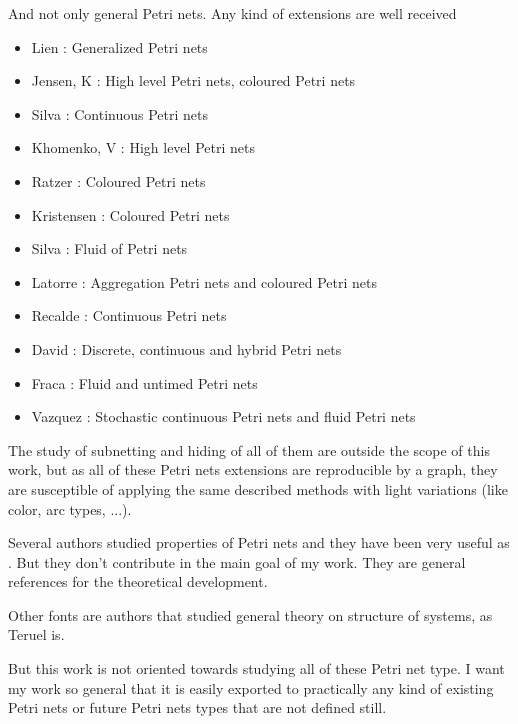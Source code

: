 And not only general Petri nets. Any kind of extensions are well received
\begin{itemize}
\item Lien \cite{EPN-Lien1976251}: Generalized Petri nets
\item Jensen, K \cite{G-EPN-Jensen1985723,EPN-SM-Jensen2007213,EPN-Jensen20091}: High level
Petri nets, coloured Petri nets
\item Silva \cite{EPN-PROP-Silva2002314,EPN-SM-Silva2011427}: Continuous Petri nets 
\item Khomenko, V \cite{G-SM-Khomenko2003458}: High level Petri nets
\item Ratzer \cite{EPN-PROP-Ratzer2003450}: Coloured Petri nets
\item Kristensen \cite{EPN-Kristensen2004626,EPN-SM-Kristensen200819}: Coloured Petri nets
\item Silva \cite{EPN-Silva2004253}: Fluid of Petri nets
\item Latorre \cite{EPN-SM-Latorre2010152,EPN-SM-Latorre2010247}: Aggregation Petri nets and coloured Petri nets
\item Recalde \cite{EPN-Recalde2010235}: Continuous Petri nets
\item David \cite{EPN-David2010}: Discrete, continuous and hybrid Petri nets
\item Fraca \cite{EPN-Fraca201221}: Fluid and untimed Petri nets
\item Vazquez \cite{EPN-Vazquez2012641,EPN-Vazquez2013365}: Stochastic continuous
Petri nets and fluid Petri nets
\end{itemize}

The study of
subnetting and hiding of all of them are outside the scope of this work,
but as all of these Petri nets extensions are reproducible by a graph, they are
susceptible of applying the same described methods with light variations
(like color, arc types, ...). 

 
Several authors studied properties of Petri nets and they have been very
useful as \cite{PROP-Murata1977412,PROP-Engelfriet1991575,PROP-Silva1992447,PROP-Recalde1998223,PROP-Zeng20021308}.
But they don't contribute in the main goal of my work. They are general references
for the theoretical development. 
 
Other fonts are authors that studied general theory on structure of systems, as Teruel \cite{G-Teruel1996271} is. 

But this work is not oriented towards studying all of these Petri net type.
I want my work so general that it is easily exported to practically any kind
of existing Petri nets or future Petri nets types that are not defined still.

